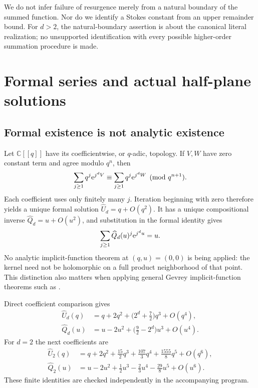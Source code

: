 \documentclass[11pt,a4paper]{article}
\numberwithin{equation}{section}
\theoremstyle{definition}\newtheorem{definition}[theorem]{Definition}
\theoremstyle{remark}\newtheorem{remark}[theorem]{Remark}
\theoremstyle{definition}
\newcommand{\C}{\mathbb C}\newcommand{\R}{\mathbb R}\newcommand{\N}{\mathbb N}\newcommand{\Z}{\mathbb Z}
\newcommand{\Uhat}{\widehat U}\newcommand{\Qhat}{\widehat Q}
\begin{document}
We do not infer failure of resurgence merely from a natural boundary of the
summed function. Nor do we identify a Stokes constant from an upper remainder
bound. For $d>2$, the natural-boundary assertion is about the canonical
literal realization; no unsupported identification with every possible
higher-order summation procedure is made.

\section{Formal series and actual half-plane solutions}
\label{sec:realization}
\subsection{Formal existence is not analytic existence}
Let $\C[[q]]$ have its coefficientwise, or $q$-adic, topology. If $V,W$ have
zero constant term and agree modulo $q^n$, then
\[
 \sum_{j\ge1}q^j\mathrm e^{j^dV}
 \equiv\sum_{j\ge1}q^j\mathrm e^{j^dW}\pmod{q^{n+1}}.
\]
Each coefficient uses only finitely many $j$. Iteration beginning with zero
therefore yields a unique formal solution $\Uhat_d=q+O(q^2)$.
It has a unique compositional inverse $\Qhat_d=u+O(u^2)$, and substitution
in the formal identity gives
\[
 \sum_{j\ge1}\Qhat_d(u)^j\e^{j^d u}=u.
\]
No analytic implicit-function theorem at $(q,u)=(0,0)$ is being applied: the
kernel need not be holomorphic on a full product neighborhood of that point.
This distinction also matters when applying general Gevrey implicit-function
theorems such as \cite{nikolaev}.

Direct coefficient comparison gives
\begin{align}
 \Uhat_d(q)&=q+2q^2+\bigl(2^d+\tfrac72\bigr)q^3+O(q^4),\label{eq:first-U}\\
 \Qhat_d(u)&=u-2u^2+\bigl(\tfrac92-2^d\bigr)u^3+O(u^4).
 \label{eq:first-Q}
\end{align}
For $d=2$ the next coefficients are
\begin{align}
 \Uhat_2(q)&=q+2q^2+\tfrac{15}{2}q^3+\tfrac{107}{3}q^4
                 +\tfrac{1555}{8}q^5+O(q^6),\label{eq:quadratic-U}\\
 \Qhat_2(u)&=u-2u^2+\tfrac12u^3-\tfrac23u^4
                 -\tfrac{29}{8}u^5+O(u^6).
 \label{eq:quadratic-Q}
\end{align}
These finite identities are checked independently in the accompanying program.
\end{document}
